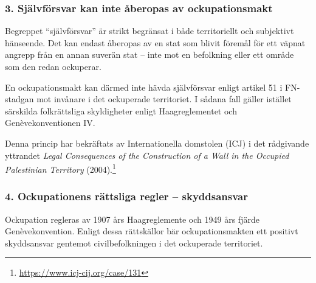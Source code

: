

\subsubsection*{3. Självförsvar kan inte åberopas av ockupationsmakt}

Begreppet \enquote{självförsvar} är strikt begränsat i både territoriellt och subjektivt hänseende. 
Det kan endast åberopas av en stat som blivit föremål för ett väpnat angrepp från en annan suverän stat – 
inte mot en befolkning eller ett område som den redan ockuperar.

En ockupationsmakt kan därmed inte hävda självförsvar enligt artikel 51 i FN-stadgan mot invånare 
i det ockuperade territoriet. I sådana fall gäller istället särskilda folkrättsliga skyldigheter enligt 
Haagreglementet och Genèvekonventionen IV.

Denna princip har bekräftats av Internationella domstolen (ICJ) i det rådgivande yttrandet 
\textit{Legal Consequences of the Construction of a Wall in the Occupied Palestinian Territory} (2004).\footnote{\url{https://www.icj-cij.org/case/131}}


\subsubsection*{4. Ockupationens rättsliga regler – skyddsansvar}

Ockupation regleras av 1907 års Haagreglemente och 1949 års fjärde Genèvekonvention. 
Enligt dessa rättskällor bär ockupationsmakten ett positivt skyddsansvar gentemot civilbefolkningen i 
det ockuperade territoriet.

